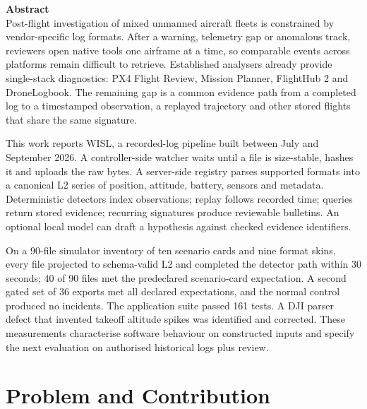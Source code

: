 \documentclass[11pt,a4paper]{article}
\begin{document}
\begin{mdframed}[style=abstractstyle]
{\sffamily\large\bfseries\color{primary} Abstract}\\[0.6em]
\linespread{1.18}\selectfont\normalsize\color{darkslate}
Post-flight investigation of mixed unmanned aircraft fleets is constrained by vendor-specific log formats.
After a warning, telemetry gap or anomalous track, reviewers open native tools one airframe at a time, so comparable events across platforms remain difficult to retrieve.
Established analysers already provide single-stack diagnostics: PX4 Flight Review, Mission Planner, FlightHub 2 and DroneLogbook.
The remaining gap is a common evidence path from a completed log to a timestamped observation, a replayed trajectory and other stored flights that share the same signature.

This work reports WISL, a recorded-log pipeline built between July and September 2026.
A controller-side watcher waits until a file is size-stable, hashes it and uploads the raw bytes.
A server-side registry parses supported formats into a canonical L2 series of position, attitude, battery, sensors and metadata.
Deterministic detectors index observations; replay follows recorded time; queries return stored evidence; recurring signatures produce reviewable bulletins.
An optional local model can draft a hypothesis against checked evidence identifiers.

On a 90-file simulator inventory of ten scenario cards and nine format skins, every file projected to schema-valid L2 and completed the detector path within 30 seconds; 40 of 90 files met the predeclared scenario-card expectation.
A second gated set of 36 exports met all declared expectations, and the normal control produced no incidents.
The application suite passed 161 tests.
A DJI parser defect that invented takeoff altitude spikes was identified and corrected.
These measurements characterise software behaviour on constructed inputs and specify the next evaluation on authorised historical logs plus review.
\end{mdframed}

\vspace{0.6em}

\clearpage

\section{Problem and Contribution}
\end{document}
